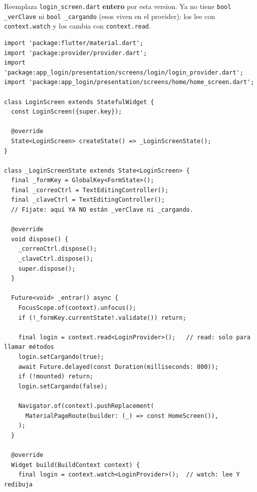 \documentclass[11pt,a4paper,oneside]{book}
\newcommand{\file}[1]{\texttt{\textcolor{brandDark}{#1}}}
\begin{document}
\begin{wherebox}
Reemplaza \file{login\_screen.dart} \textbf{entero} por esta version. Ya no tiene
\texttt{bool \_verClave} ni \texttt{bool \_cargando} (esos viven en el provider): los
lee con \texttt{context.watch} y los cambia con \texttt{context.read}.
\end{wherebox}

\begin{lstlisting}
import 'package:flutter/material.dart';
import 'package:provider/provider.dart';
import 'package:app_login/presentation/screens/login/login_provider.dart';
import 'package:app_login/presentation/screens/home/home_screen.dart';

class LoginScreen extends StatefulWidget {
  const LoginScreen({super.key});

  @override
  State<LoginScreen> createState() => _LoginScreenState();
}

class _LoginScreenState extends State<LoginScreen> {
  final _formKey = GlobalKey<FormState>();
  final _correoCtrl = TextEditingController();
  final _claveCtrl = TextEditingController();
  // Fíjate: aquí YA NO están _verClave ni _cargando.

  @override
  void dispose() {
    _correoCtrl.dispose();
    _claveCtrl.dispose();
    super.dispose();
  }

  Future<void> _entrar() async {
    FocusScope.of(context).unfocus();
    if (!_formKey.currentState!.validate()) return;

    final login = context.read<LoginProvider>();   // read: solo para llamar métodos
    login.setCargando(true);
    await Future.delayed(const Duration(milliseconds: 800));
    if (!mounted) return;
    login.setCargando(false);

    Navigator.of(context).pushReplacement(
      MaterialPageRoute(builder: (_) => const HomeScreen()),
    );
  }

  @override
  Widget build(BuildContext context) {
    final login = context.watch<LoginProvider>();  // watch: lee Y redibuja


\end{lstlisting}
\end{document}
